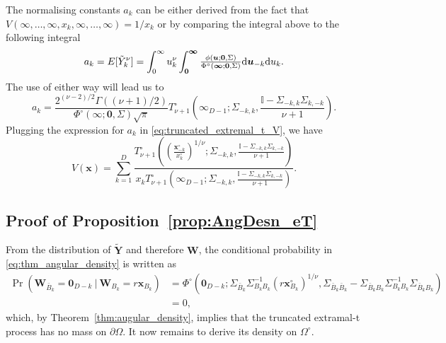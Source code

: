 \documentclass[12pt]{article}
\begin{document}
The normalising constants $a_k$ can be either derived from the fact that $V(\infty,\dots,\infty,x_k,\infty,\dots,\infty) = 1/x_k$ or by comparing the integral above to the following integral 
\begin{equation*}
\label{eq:normalising_trunc}
a_k = E[\tilde Y_k^\nu] = \int_0^\infty u_k^\nu \int_{\bm 0}^{\bm \infty} {\textstyle{\phi(\bm u; \bm 0,\Sigma)\over\Phi^\circ(\bm \infty;\bm 0, \Sigma)}}\text d \bm u_{-k}\text d u_k.	
\end{equation*}
The use of either way will lead us to 
\begin{equation*}
\label{eq:truncate_extremal_t_a}
a_k =\frac{2^{(\nu-2)/2}\Gamma((\nu+1)/2)}{\Phi^\circ(\bm \infty;\bm 0, \Sigma)\sqrt{\pi}} T_{\nu+1}^\circ\left(
\bm \infty_{D-1}
;\Sigma_{-k,k},\frac{\mathbb{I}-\Sigma_{-k,k}\Sigma_{k,-k}}{\nu+1}\right).
\end{equation*}
Plugging the expression for $a_k$ in \eqref{eq:truncated_extremal_t_V}, we have 
\begin{equation*}
V(\bm x) = \sum_{k=1}^D \frac{T_{\nu+1}^\circ\left( \left(\frac{\bm x_{-k}^\circ}{x_k^\circ}\right)^{1/\nu} ;\Sigma_{-k,k},\frac{\mathbb{I}-\Sigma_{-k,k}\Sigma_{k,-k}}{\nu+1}\right)}{x_k T_{\nu+1}^\circ\left(\bm \infty_{D-1};\Sigma_{-k,k},\frac{\mathbb{I}-\Sigma_{-k,k}\Sigma_{k,-k}}{\nu+1}\right)}.	
\end{equation*}

\subsection{Proof of Proposition~\ref{prop:AngDesn_eT}}

From the distribution of $\tilde{\bm Y}$ and therefore $\bm W$, the conditional probability in \eqref{eq:thm_angular_density} is written as
%
\begin{align*}
\Pr(\bm W_{\bar{B}_k} = \bm 0_{D-k} \ | \ \bm W_{B_k} = r \bm x_{B_k} )
& = \Phi^\circ \left( \bm 0_{D-k};
\Sigma_{\bar{B}_k}\Sigma_{B_k B_k}^{-1} \left(r \bm x_{B_k}^\circ\right)^{1/\nu},\Sigma_{\bar{B}_k\bar{B}_k}-\Sigma_{\bar{B}_k B_k}\Sigma_{B_k B_k}^{-1}\Sigma_{\bar{B}_k B_k} \right) \\
& = 0,
\end{align*}
%
which, by Theorem~\ref{thm:augular_density}, implies that the truncated extramal-t process has no mass on $\partial\Omega$. It now remains to derive its density on $\Omega^\circ$. 
\end{document}
